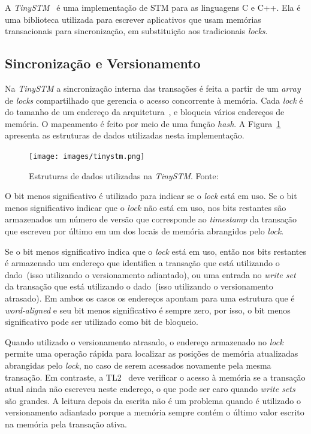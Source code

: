 \documentclass[diss,capa]{texufpel}
\begin{document}
A \emph{TinySTM}~\cite{TINY} é uma implementação de STM para as linguagens C e C++. Ela é uma biblioteca utilizada para escrever aplicativos que usam memórias transacionais para sincronização, em substituição aos tradicionais \emph{locks}.

\subsection{Sincronização e Versionamento}

Na \emph{TinySTM} a sincronização interna das transações é feita a partir de um \emph{array} de \emph{locks} compartilhado que gerencia o acesso concorrente à memória. Cada \emph{lock} é do tamanho de um endereço da arquitetura~\cite{TINY}, e bloqueia vários endereços de memória. O mapeamento é feito por meio de uma função \emph{hash}. A Figura~\ref{figurasincronisacaotinystm} apresenta as estruturas de dados utilizadas nesta implementação.

\begin{figure}[!htp]
\centering
\texttt{[image: images/tinystm.png]}
\caption{Estruturas de dados utilizadas na \emph{TinySTM}. Fonte:~\cite{TINY}}
\label{figurasincronisacaotinystm}
\end{figure}

O bit menos significativo é utilizado para indicar se o \emph{lock} está em uso. Se o bit menos significativo indicar que o \emph{lock} não está em uso, nos bits restantes são armazenados um número de versão que corresponde ao \emph{timestamp} da transação que escreveu por último em um dos locais de memória abrangidos pelo \emph{lock}.

Se o bit menos significativo indica que o \emph{lock} está em uso, então nos bits restantes é armazenado um endereço que identifica a transação que está utilizando o dado~(isso utilizando o versionamento adiantado), ou uma entrada no \emph{write set} da transação que está utilizando o dado~(isso utilizando o versionamento atrasado). Em ambos os casos os endereços apontam para uma estrutura que é \emph{word-aligned} e seu bit menos significativo é sempre zero, por isso, o bit menos significativo pode ser utilizado como bit de bloqueio.

Quando utilizado o versionamento atrasado, o endereço armazenado no \emph{lock} permite uma operação rápida para localizar as posições de memória atualizadas abrangidas pelo \emph{lock}, no caso de serem acessados novamente pela mesma transação. Em contraste, a TL2~\cite{tl2} deve verificar o acesso à memória se a transação atual ainda não escreveu neste endereço, o que pode ser caro quando \emph{write sets} são grandes. A leitura depois da escrita não é um problema quando é utilizado o versionamento adiantado porque a memória sempre contém o último valor escrito na memória pela transação ativa.
\end{document}
